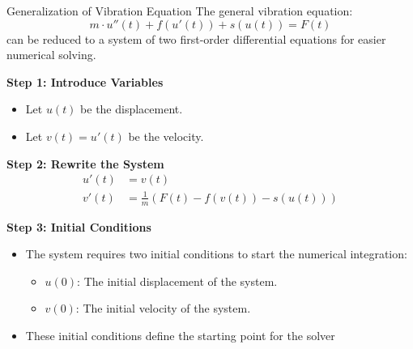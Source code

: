 \documentclass[10pt, aspectratio=54]{beamer}
\begin{document}
\begin{frame}{Generalization of Vibration Equation }
	\justifying
	The general vibration equation:
	\[
	m \cdot u''(t) + f(u'(t)) + s(u(t)) = F(t)
	\]
	can be reduced to a system of two first-order differential equations for easier numerical solving. 
	
	\textbf{Step 1: Introduce Variables}
	\begin{itemize}
		\item Let \( u(t) \) be the displacement.
		\item Let \( v(t) = u'(t) \) be the velocity.
	\end{itemize}
	
	\textbf{Step 2: Rewrite the System}
	\[
	\begin{aligned}
		u'(t) &= v(t) \\
		v'(t) &= \frac{1}{m} \left( F(t) - f(v(t)) - s(u(t)) \right)
	\end{aligned}
	\]
	
	\textbf{Step 3: Initial Conditions}
	\begin{itemize}
		\item The system requires two initial conditions to start the numerical integration:
		\begin{itemize}
			\item \( u(0) \): The initial displacement of the system.
			\item \( v(0) \): The initial velocity of the system.
		\end{itemize}
		\item These initial conditions define the starting point for the solver
	\end{itemize}
\end{frame}
\end{document}
